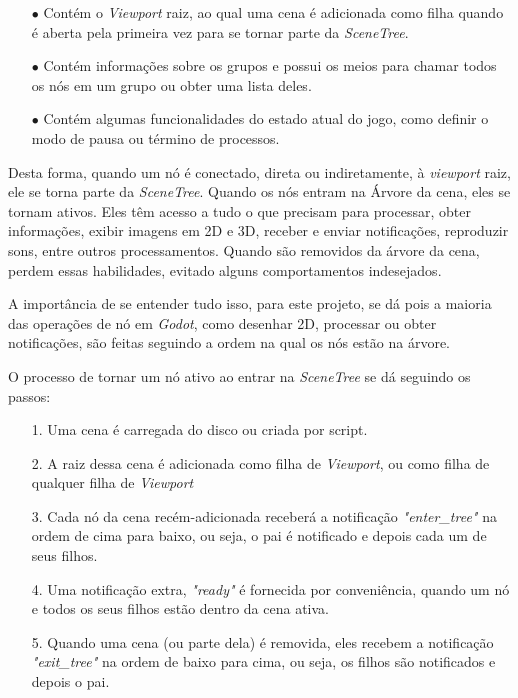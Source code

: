 \begin{itemize}
    \item[$\bullet$]
        Contém o \textit{Viewport} raiz, ao qual uma cena é adicionada 
        como filha quando é aberta pela primeira vez para se tornar parte da
        \textit{SceneTree}.
    \item[$\bullet$]
        Contém informações sobre os grupos e possui os meios para chamar 
        todos os nós em um grupo ou obter uma lista deles.
    \item[$\bullet$]
        Contém algumas funcionalidades do estado atual do
        jogo, como definir o modo de pausa ou término de processos.
\end{itemize}

Desta forma, quando um nó é conectado, direta ou indiretamente, à 
\textit{viewport} raiz, ele se torna parte da \textit{SceneTree}. Quando os nós 
entram na Árvore da cena, eles se tornam ativos. Eles têm acesso a tudo o que 
precisam para processar, obter informações, exibir imagens em 2D e 3D, receber 
e enviar notificações, reproduzir sons, entre outros processamentos. Quando são
removidos da árvore da cena, perdem essas habilidades, evitado alguns 
comportamentos indesejados.

A importância de se entender tudo isso, para este projeto, se dá pois a maioria
das operações de nó em \textit{Godot}, como desenhar 2D, processar ou obter 
notificações, são feitas seguindo a ordem na qual os nós estão na árvore.

O processo de tornar um nó ativo ao entrar na \textit{SceneTree} se dá seguindo
os passos:
\begin{itemize}
    \item[1.]
        Uma cena é carregada do disco ou criada por script.
    \item[2.]
        A raiz dessa cena é adicionada como filha de \textit{Viewport}, ou como 
        filha de qualquer filha de \textit{Viewport}
    \item[3.]
        Cada nó da cena recém-adicionada receberá a notificação 
        \textit{"enter\_tree"} na ordem de cima para baixo, ou seja, o pai é
        notificado e depois cada um de seus filhos.
    \item[4.]
        Uma notificação extra, \textit{"ready"} é fornecida por conveniência, 
        quando um nó e todos os seus filhos estão dentro da cena ativa.
    \item[5.]
        Quando uma cena (ou parte dela) é removida, eles recebem a notificação
        \textit{"exit\_tree"} na ordem de baixo para cima, ou seja, os filhos são
        notificados e depois o pai.
\end{itemize}

